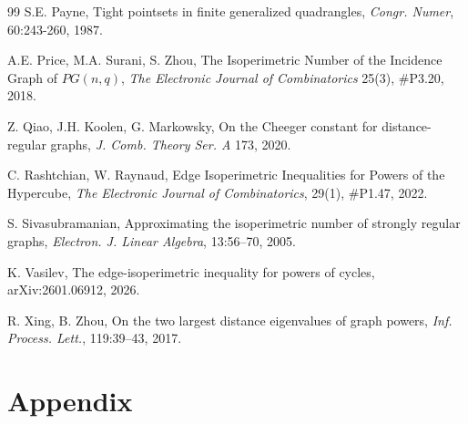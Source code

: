 \documentclass[a4paper,11pt]{article}
\theoremstyle{definition}
\newcommand{\marrow}{\marginpar[\hfill$\longrightarrow$]{$\longleftarrow$}}
\newcommand{\niceremarkcolor}[4]{\textcolor{#4}{\textsc{#1 #2:} \marrow\textsf{#3}}}
\newcommand{\jim}[2][says]{\niceremarkcolor{Jim}{#1}{#2}{Green}}
\begin{document}
\begin{thebibliography}{99}
 S.E. Payne, Tight pointsets in finite generalized quadrangles, \emph{Congr. Numer}, 60:243-260, 1987.


 A.E. Price, M.A. Surani, S. Zhou, The Isoperimetric Number of the Incidence Graph of $PG(n,q)$, \emph{The Electronic Journal of Combinatorics} 25(3), \#P3.20, 2018.

 Z. Qiao, J.H. Koolen, G. Markowsky, On the Cheeger constant for distance-regular graphs, \emph{J. Comb. Theory Ser. A} 173, 2020.

C. Rashtchian, W. Raynaud, Edge Isoperimetric Inequalities for Powers of the Hypercube, \emph{The Electronic Journal of Combinatorics}, 29(1), \#P1.47, 2022.


 S. Sivasubramanian, Approximating the isoperimetric number of strongly regular graphs, \emph{Electron. J. Linear Algebra}, 13:56--70, 2005.


 K. Vasilev, The edge-isoperimetric inequality for powers of cycles, arXiv:2601.06912, 2026.
 

 R. Xing, B. Zhou, On the two largest distance eigenvalues of graph powers, \emph{Inf. Process. Lett.}, 119:39--43, 2017.




\end{thebibliography}





\newpage
\appendix
\renewcommand{\thetable}{A\arabic{table}}
\setcounter{table}{0}

\section{Appendix}\label{sec:app_sims}
\end{document}
